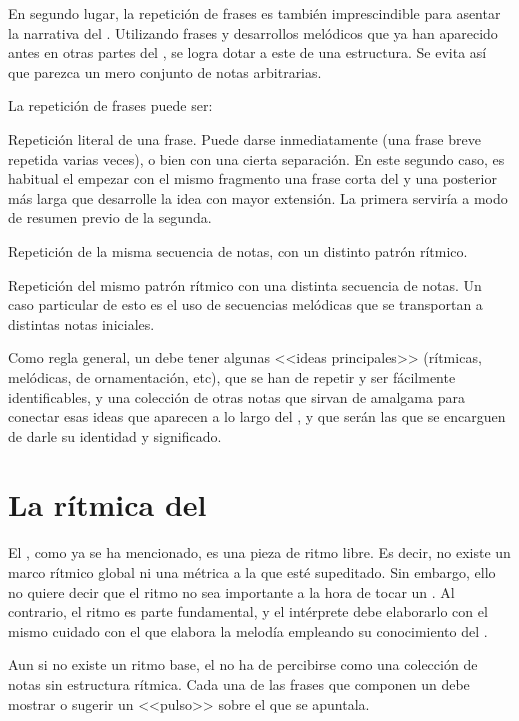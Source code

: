 En segundo lugar, la repetición de frases es también imprescindible para asentar la narrativa del \taqsimb. Utilizando frases y desarrollos melódicos que ya han aparecido antes en otras partes del \taqsimb, se logra dotar a este de una estructura. Se evita así que parezca un mero conjunto de notas arbitrarias.

La repetición de frases puede ser:

\begin{compactitem}
\item Repetición literal de una frase. Puede darse inmediatamente (una frase breve repetida varias veces), o bien con una cierta separación. En este segundo caso, es habitual el empezar con el mismo fragmento una frase corta del \taqsim y una posterior más larga que desarrolle la idea con mayor extensión. La primera serviría a modo de resumen previo de la segunda.
\item Repetición de la misma secuencia de notas, con un distinto patrón rítmico.
\item Repetición del mismo patrón rítmico con una distinta secuencia de notas. Un caso particular de esto es el uso de secuencias melódicas que se transportan a distintas notas iniciales.
\end{compactitem}

Como regla general, un \taqsim debe tener algunas <<ideas principales>> (rítmicas, melódicas, de ornamentación, etc), que se han de repetir y ser fácilmente identificables, y una colección de otras notas que sirvan de amalgama para conectar esas ideas que aparecen a lo largo del \taqsimb, y que serán las que se encarguen de darle su identidad y significado.

\section{La rítmica del \taqsimb}
\label{ritmotaqsim}

El \taqsimb, como ya se ha mencionado, es una pieza de ritmo libre. Es decir, no existe un marco rítmico global ni una métrica a la que esté supeditado. Sin embargo, ello no quiere decir que el ritmo no sea importante a la hora de tocar un \taqsimb. Al contrario, el ritmo es parte fundamental, y el intérprete debe elaborarlo con el mismo cuidado con el que elabora la melodía empleando su conocimiento del \maqamb.

Aun si no existe un ritmo base, el \taqsim no ha de percibirse como una colección de notas sin estructura rítmica. Cada una de las frases que componen un \taqsim debe mostrar o sugerir un <<pulso>> sobre el que se apuntala.

